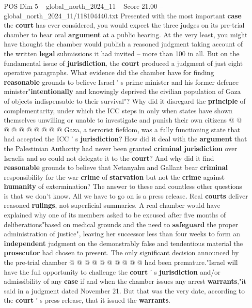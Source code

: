 \begin{textsample}{POS Dim 5 – global\_north\_2024\_11 – Score 21.00 – global\_north\_2024\_11/118104440.txt}
Presented with the most important \textbf{case} the \textbf{court} has ever considered, you would expect the three judges on its pre-trial chamber to hear oral \textbf{argument} at a public hearing.
At the very least, you might have thought the chamber would publish a reasoned judgment taking account of the written \textbf{legal} submissions it had invited -- more than 100 in all.
But on the fundamental issue of \textbf{jurisdiction}, the \textbf{court} produced a judgment of just eight operative paragraphs.
What evidence did the chamber have for finding \textbf{reasonable} grounds to believe Israel ' s prime minister and his former defence minister"\textbf{intentionally} and knowingly deprived the civilian population of Gaza of objects indispensable to their survival"?
Why did it disregard the \textbf{principle} of complementarity, under which the ICC steps in only when states have shown themselves unwilling or unable to investigate and punish their own citizens @ @ @ @ @ @ @ @ @ @ Gaza, a terrorist fiefdom, was a fully functioning state that had accepted the ICC ' s \textbf{jurisdiction}?
How did it deal with the \textbf{argument} that the Palestinian Authority had never been granted \textbf{criminal} \textbf{jurisdiction} over Israelis and so could not delegate it to the \textbf{court}?
And why did it find \textbf{reasonable} grounds to believe that Netanyahu and Gallant bear \textbf{criminal} responsibility for the war \textbf{crime} of \textbf{starvation} but not the \textbf{crime} against \textbf{humanity} of extermination?
The answer to these and countless other questions is that we don't know.
All we have to go on is a press release.
Real \textbf{courts} deliver reasoned \textbf{rulings}, not superficial summaries.
A real chamber would have explained why one of its members asked to be excused after five months of deliberations"based on medical grounds and the need to \textbf{safeguard} the proper administration of justice", leaving her successor less than four weeks to form an \textbf{independent} judgment on the demonstrably false and tendentious material the \textbf{prosecutor} had chosen to present.
The only significant decision announced by the pre-trial chamber @ @ @ @ @ @ @ @ @ @ had been premature."Israel will have the full opportunity to challenge the \textbf{court} ' s \textbf{jurisdiction} and/or admissibility of any \textbf{case} if and when the chamber issues any arrest \textbf{warrants},"it said in a judgment dated November 21.
But that was the very date, according to the \textbf{court} ' s press release, that it issued the \textbf{warrants}.

\end{textsample}

